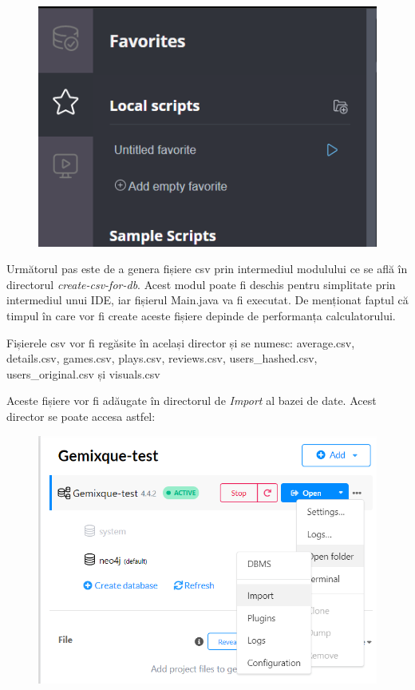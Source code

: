 \documentclass[12pt,a4paper]{report}
\begin{document}
\begin{enumerate}
      \begin{figure}[H]
\centering
\caption{}
\begin{adjustbox}{max size={\textwidth}{\textheight}}
\includegraphics[scale=0.6]{exemplu_54_add_favorites}
\end{adjustbox}
\caption*{}
\end{figure}

Următorul pas este de a genera fișiere csv prin intermediul modulului ce se află în directorul \emph{create-csv-for-db}. Acest modul poate fi deschis pentru simplitate prin intermediul unui IDE, iar fișierul Main.java va fi executat. De menționat faptul că timpul în care vor fi create aceste fișiere depinde de performanța calculatorului.

Fișierele csv vor fi regăsite în același director și se numesc: average.csv, details.csv, games.csv, plays.csv, reviews.csv, users\_hashed.csv, users\_original.csv și visuals.csv

Aceste fișiere vor fi adăugate în directorul de \emph{Import} al bazei de date. Acest director se poate accesa astfel:

      \begin{figure}[H]
\centering
\caption{}
\begin{adjustbox}{max size={\textwidth}{\textheight}}
\includegraphics[scale=0.6]{exemplu_55_import}
\end{adjustbox}
\caption*{}
\end{figure}


\end{enumerate}
\end{document}
